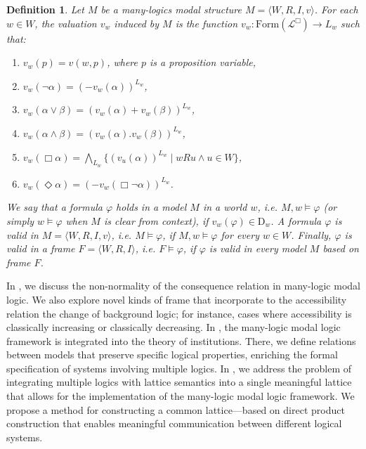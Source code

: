 \documentclass{amsart}
\newtheorem{definition}{Definition}[section]
\newcommand{\so}{\rightarrow}
\newcommand{\pair}[1]{\langle #1 \rangle}
\newcommand{\mlms}{many-logics modal structure }
\newcommand{\For}{\mathrm{Form}}
\begin{document}
\begin{definition} \label{def.valuation.mlms} 
Let $M$ be a \mlms $M = \pair{W,R,{I},v}$.  For each $w\in W$, the valuation $v_w$ induced by $M$ is the function $v_{w}: \For(\mathcal{L}^\Box) \longrightarrow L_{w}$ such that: 
		\begin{enumerate}
			\item $v_{w}(p) = v(w, p)$, where $p$ is a proposition variable,
			\item $v_{w}(\lnot \alpha) = (- v_{w}(\alpha))^{L_{w}}$,
			\item $v_{w}(\alpha \lor \beta) = (v_{w}(\alpha) + v_{w}(\beta))^{L_{w}}$,
			\item $v_{w}(\alpha \land \beta) = (v_{w}(\alpha).v_{w}(\beta))^{L_{w}}$,
                \item $v_{{w}}(\Box \alpha)=\bigwedge\limits_{L_{{w}}}\{(v_{u}(\alpha))^{L_{{w}}} \mid {w} R u \land u \in W\}$,
                \item $v_{w}(\Diamond \alpha) = (- v_{w}(\Box \lnot \alpha))^{L_{w}}$.
 	\end{enumerate}

We say that a formula $\varphi$ holds in a model $M$ in a world $w$, i.e. $M, w \vDash \varphi$ (or simply $w \vDash \varphi$ when $M$ is clear from context), if $v_w(\varphi) \in \mathrm{D}_w$. A formula $\varphi$ is valid in $M = \pair{W, R, I, v}$, i.e. $M \vDash \varphi$, if $M, w \vDash \varphi$ for every $w \in W$. Finally, $\varphi$ is valid in a frame $F = \pair{W, R, I}$, i.e. $F \vDash \varphi$, if $\varphi$ is valid in every model $M$ based on frame $F$.
\end{definition}


In \cite{freire_modality_2024}, we discuss the non-normality of the consequence relation in many-logic modal logic. We also explore novel kinds of frame that incorporate to the accessibility relation the change of background logic; for instance, cases where accessibility is classically increasing or classically decreasing. In \cite{freire_institution_2025}, the many-logic modal logic framework is integrated into the theory of institutions. There, we define relations between models that preserve specific logical properties, enriching the formal specification of systems involving multiple logics. In \cite{freire_lattices_2025}, we address the problem of integrating multiple logics with lattice semantics into a single meaningful lattice that allows for the implementation of the many-logic modal logic framework. We propose a method for constructing a common lattice—based on direct product construction that enables meaningful communication between different logical systems.
\end{document}
